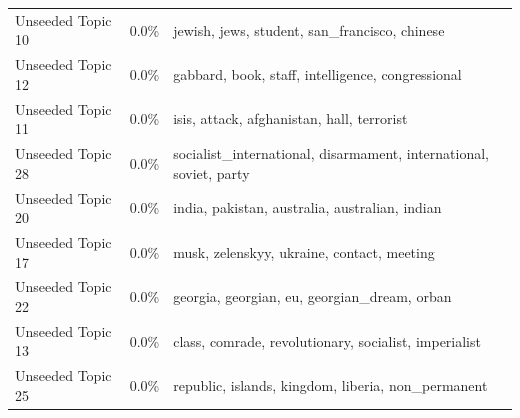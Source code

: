 \begin{table}
\begin{tabular}{lrp{8cm}}
Unseeded Topic 10 & 0.0\% & jewish, jews, student, san\_francisco, chinese \\
Unseeded Topic 12 & 0.0\% & gabbard, book, staff, intelligence, congressional \\
Unseeded Topic 11 & 0.0\% & isis, attack, afghanistan, hall, terrorist \\
Unseeded Topic 28 & 0.0\% & socialist\_international, disarmament, international, soviet, party \\
Unseeded Topic 20 & 0.0\% & india, pakistan, australia, australian, indian \\
Unseeded Topic 17 & 0.0\% & musk, zelenskyy, ukraine, contact, meeting \\
Unseeded Topic 22 & 0.0\% & georgia, georgian, eu, georgian\_dream, orban \\
Unseeded Topic 13 & 0.0\% & class, comrade, revolutionary, socialist, imperialist \\
Unseeded Topic 25 & 0.0\% & republic, islands, kingdom, liberia, non\_permanent \\
\bottomrule
\end{tabular}
\end{table}
